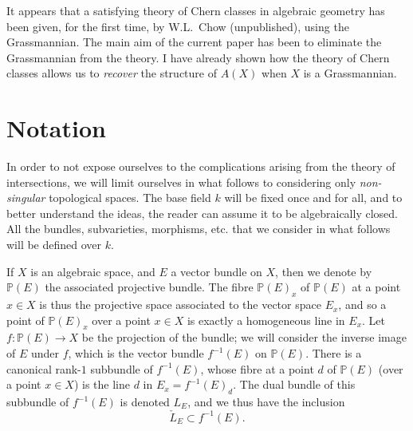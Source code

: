 \documentclass{article}
\begin{document}
It appears that a satisfying theory of Chern classes in algebraic geometry has been given, for the first time, by W.L.~Chow (unpublished), using the Grassmannian.
The main aim of the current paper has been to eliminate the Grassmannian from the theory.
I have already shown \cite{4} how the theory of Chern classes allows us to \emph{recover} the structure of $A(X)$ when $X$ is a Grassmannian.


\section{Notation}
\label{section1}

In order to not expose ourselves to the complications arising from the theory of intersections, we will limit ourselves in what follows to considering only \emph{non-singular} topological spaces.
The base field $k$ will be fixed once and for all, and to better understand the ideas, the reader can assume it to be algebraically closed.
All the bundles, subvarieties, morphisms, etc. that we consider in what follows will be defined over $k$.

If $X$ is an algebraic space, and $E$ a vector bundle on $X$, then we denote by $\mathbb{P}(E)$ the associated projective bundle.
The fibre $\mathbb{P}(E)_x$ of $\mathbb{P}(E)$ at a point $x\in X$ is thus the projective space associated to the vector space $E_x$, and so a point of $\mathbb{P}(E)_x$ over a point $x\in X$ is exactly a homogeneous line in $E_x$.
Let $f\colon\mathbb{P}(E)\to X$ be the projection of the bundle;
we will consider the inverse image of $E$ under $f$, which is the vector bundle $f^{-1}(E)$ on $\mathbb{P}(E)$.
There is a canonical rank-$1$ subbundle of $f^{-1}(E)$, whose fibre at a point $d$ of $\mathbb{P}(E)$ (over a point $x\in X$) is the line $d$ in $E_x=f^{-1}(E)_d$.
The dual bundle of this subbundle of $f^{-1}(E)$ is denoted $L_E$, and we thus have the inclusion
\[
  \check{L}_E \subset f^{-1}(E).
\]
\end{document}

